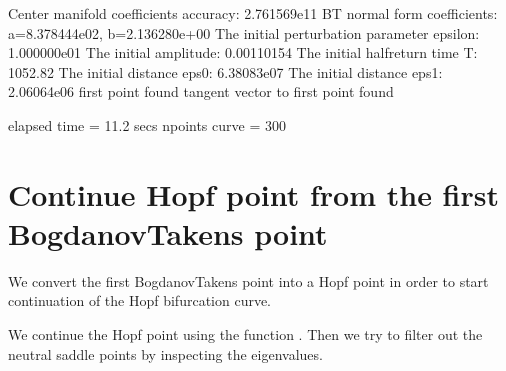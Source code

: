 \documentclass[letterpaper,10pt,english]{jupyterBook}
\begin{document}
\begin{sphinxVerbatim}[commandchars=\\\{\}]
Center manifold coefficients\PYGZsq{} accuracy: 2.761569e\PYGZhy{}11
BT normal form coefficients:
a=\PYGZhy{}8.378444e\PYGZhy{}02,	 b=\PYGZhy{}2.136280e+00
The initial perturbation parameter epsilon:  1.000000e\PYGZhy{}01
The initial amplitude: 0.00110154
The initial half\PYGZhy{}return time T: 1052.82
The initial distance eps0: 6.38083e\PYGZhy{}07
The initial distance eps1: 2.06064e\PYGZhy{}06
first point found
tangent vector to first point found

elapsed time  = 11.2 secs
npoints curve = 300
\end{sphinxVerbatim}


\section{Continue Hopf point from the first Bogdanov\sphinxhyphen{}Takens point}
\label{\detokenize{CO-oxidation:continue-hopf-point-from-the-first-bogdanov-takens-point}}
\sphinxAtStartPar
We convert the first Bogdanov\sphinxhyphen{}Takens point into a Hopf point in order to
start continuation of the Hopf bifurcation curve.

\begin{sphinxVerbatim}[commandchars=\\\{\}]
\PYG{p}{[}\PYG{p}{]}
\end{sphinxVerbatim}

\sphinxAtStartPar
We continue the Hopf point using the function . Then we try to filter out
the neutral saddle points by inspecting the eigenvalues.
\end{document}
